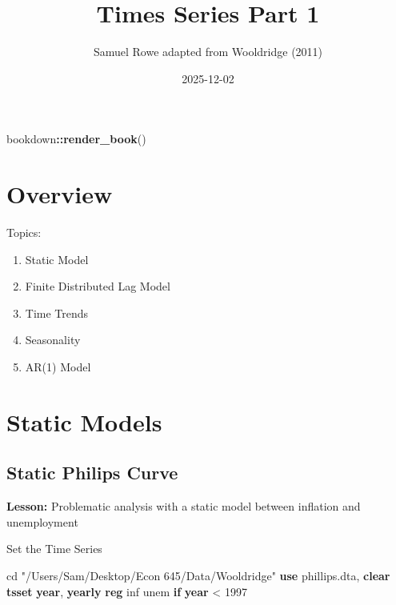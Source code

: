 \documentclass[
]{book}
\title{Times Series Part 1}
\author{Samuel Rowe adapted from Wooldridge (2011)}
\date{2025-12-02}
\newenvironment{Shaded}{\begin{snugshade}}{\end{snugshade}}
\newcommand{\FunctionTok}[1]{\textcolor[rgb]{0.13,0.29,0.53}{\textbf{#1}}}
\newcommand{\KeywordTok}[1]{\textcolor[rgb]{0.13,0.29,0.53}{\textbf{#1}}}
\newcommand{\NormalTok}[1]{#1}
\newcommand{\SpecialCharTok}[1]{\textcolor[rgb]{0.81,0.36,0.00}{\textbf{#1}}}
\newcommand{\StringTok}[1]{\textcolor[rgb]{0.31,0.60,0.02}{#1}}
\providecommand{\tightlist}{%
  \setlength{\itemsep}{0pt}\setlength{\parskip}{0pt}}
\begin{document}
\maketitle

{
\setcounter{tocdepth}{1}
\tableofcontents
}
\begin{Shaded}
\begin{Highlighting}[]
\NormalTok{bookdown}\SpecialCharTok{::}\FunctionTok{render\_book}\NormalTok{()}
\end{Highlighting}
\end{Shaded}

\chapter*{Overview}\label{overview}

Topics:

\begin{enumerate}
\def\labelenumi{\arabic{enumi}.}
\tightlist
\item
  Static Model
\item
  Finite Distributed Lag Model
\item
  Time Trends
\item
  Seasonality
\item
  AR(1) Model
\end{enumerate}

\chapter{Static Models}\label{static-models}

\section{Static Philips Curve}\label{static-philips-curve}

\textbf{Lesson:} Problematic analysis with a static model between inflation and
unemployment

Set the Time Series

\begin{Shaded}
\begin{Highlighting}[]
\NormalTok{cd }\StringTok{"/Users/Sam/Desktop/Econ 645/Data/Wooldridge"}
\KeywordTok{use}\NormalTok{ phillips.dta, }\KeywordTok{clear}
\KeywordTok{tsset} \FunctionTok{year}\NormalTok{, }\FunctionTok{yearly}
\KeywordTok{reg}\NormalTok{ inf unem }\KeywordTok{if} \FunctionTok{year}\NormalTok{ \textless{} 1997}
\end{Highlighting}
\end{Shaded}
\end{document}
